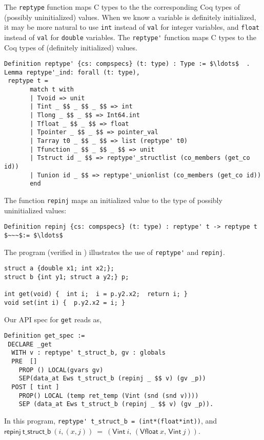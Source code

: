 \documentclass[12pt,fleqn,openany,oneside,showtrims]{memoir}
\begin{document}
The \lstinline{reptype} function maps C types to
the the corresponding Coq types of (possibly uninitialized) values.
When we know a variable is definitely initialized,
it may be more natural to use \lstinline{int} instead of \lstinline{val}
for integer variables, and \lstinline{float} instead of \lstinline{val}
for \lstinline{double} variables.
The \lstinline{reptype'} function maps C types
to the Coq types of (definitely initialized) values.
\begin{lstlisting}
Definition reptype' {cs: compspecs} (t: type) : Type := $\ldots$  .
Lemma reptype'_ind: forall (t: type),
 reptype t =
       match t with
       | Tvoid => unit
       | Tint _ $$ _ $$ _ $$ => int
       | Tlong _ $$ _ $$ => Int64.int
       | Tfloat _ $$ _ $$ => float
       | Tpointer _ $$ _ $$ => pointer_val
       | Tarray t0 _ $$ _ $$ => list (reptype' t0)
       | Tfunction _ $$ _ $$ _ $$ => unit
       | Tstruct id _ $$ => reptype'_structlist (co_members (get_co id))
       | Tunion id _ $$ => reptype'_unionlist (co_members (get_co id))
       end
\end{lstlisting}
\vspace{-3ex}
The function \lstinline{repinj} maps an initialized value to
the type of possibly uninitialized values:
\begin{lstlisting}
Definition repinj {cs: compspecs} (t: type) : reptype' t -> reptype t $~~~$:= $\ldots$
\end{lstlisting}

The program  (verified in
)  illustrates the use of \lstinline{reptype'}
and \lstinline{repinj}.
\begin{lstlisting}
struct a {double x1; int x2;};
struct b {int y1; struct a y2;} p;

int get(void) {  int i;  i = p.y2.x2;  return i; }
void set(int i) {  p.y2.x2 = i; }
\end{lstlisting}
Our API spec for \lstinline{get} reads as,
\begin{lstlisting}
Definition get_spec :=
 DECLARE _get
  WITH v : reptype' t_struct_b, gv : globals
  PRE  []
    PROP () LOCAL(gvars gv)
    SEP(data_at Ews t_struct_b (repinj _ $$ v) (gv _p))
  POST [ tint ]
    PROP() LOCAL (temp ret_temp (Vint (snd (snd v))))
    SEP (data_at Ews t_struct_b (repinj _ $$ v) (gv _p)).
\end{lstlisting}
In this program, \lstinline{reptype' t_struct_b = (int*(float*int))},
and \newline
$\mathsf{repinj}~\mathsf{t\_struct\_b}~(i,(x,j))~=~(\mathsf{Vint}~i,\,(\mathsf{Vfloat}~x,\,\mathsf{Vint}~j))$.
\end{document}
